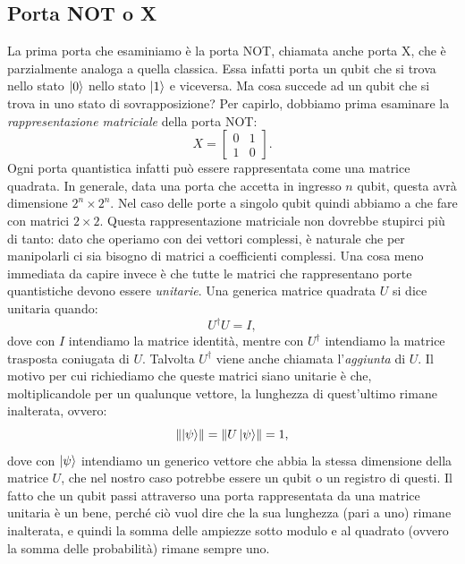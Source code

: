 \documentclass{book}
\theoremstyle{definition}
\theoremstyle{definition}
\theoremstyle{definition}
\theoremstyle{plain}
\theoremstyle{plain}
\theoremstyle{plain}
\theoremstyle{plain}
\begin{document}
\subsection{Porta NOT o X}
La prima porta che esaminiamo è la porta NOT, chiamata anche porta X, che è parzialmente analoga a quella classica. Essa infatti porta un qubit che si trova nello stato $\ket{0}$ nello stato $\ket{1}$ e viceversa. Ma cosa succede ad un qubit che si trova in uno stato di sovrapposizione? Per capirlo, dobbiamo prima esaminare la \emph{rappresentazione matriciale} della porta NOT:
\begin{displaymath}
X =
\begin{bmatrix}
0 & 1\\
1 & 0
\end{bmatrix}.
\end{displaymath}
Ogni porta quantistica infatti può essere rappresentata come una matrice quadrata. In generale, data una porta che accetta in ingresso $n$ qubit, questa avrà dimensione $2^{n} \times 2^{n}$. Nel caso delle porte a singolo qubit quindi abbiamo a che fare con matrici $2 \times 2$. Questa rappresentazione matriciale non dovrebbe stupirci più di tanto: dato che operiamo con dei vettori complessi, è naturale che per manipolarli ci sia bisogno di matrici a coefficienti complessi. Una cosa meno immediata da capire invece è che tutte le matrici che rappresentano porte quantistiche devono essere \emph{unitarie}. Una generica matrice quadrata $U$ si dice unitaria quando:
\begin{displaymath}
U^{\dagger} U = I ,
\end{displaymath}
dove con $I$ intendiamo la matrice identità, %
mentre con $U^{\dagger}$ intendiamo la matrice trasposta coniugata di $U$. Talvolta $U^{\dagger}$ viene anche chiamata l'\emph{aggiunta} di $U$. Il motivo per cui richiediamo che queste matrici siano unitarie è che, moltiplicandole per un qualunque vettore, la lunghezza di quest'ultimo rimane inalterata, ovvero:
\begin{displaymath}
\left\lVert \ket{\psi} \right\rVert = \left\lVert U \ket{\psi} \right\rVert = 1 ,
\end{displaymath}
dove con $\ket{\psi}$ intendiamo un generico vettore che abbia la stessa dimensione della matrice $U$, che nel nostro caso potrebbe essere un qubit o un registro di questi. Il fatto che un qubit passi attraverso una porta rappresentata da una matrice unitaria è un bene, perché ciò vuol dire che la sua lunghezza (pari a uno) rimane inalterata, e quindi la somma delle ampiezze sotto modulo e al quadrato (ovvero la somma delle probabilità) rimane sempre uno.\\
\end{document}
